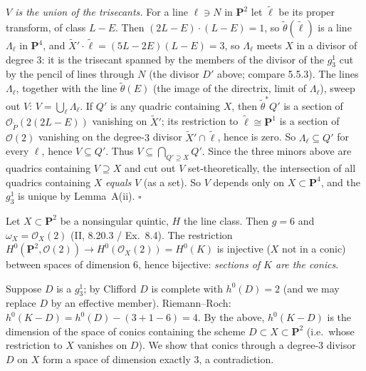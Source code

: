 \documentclass[11pt]{article}
\begin{document}
\emph{$V$ is the union of the trisecants.} For a line $\ell\ni N$ in $\mathbf P^2$ let $\tilde\ell$ be its proper transform, of class $L-E$. Then $(2L-E)\cdot(L-E)=1$, so $\tilde\theta(\tilde\ell)$ is a line $\Lambda_\ell$ in $\mathbf P^4$, and $\tilde X'\cdot\tilde\ell=(5L-2E)(L-E)=3$, so $\Lambda_\ell$ meets $X$ in a divisor of degree $3$: it is the trisecant spanned by the members of the divisor of the $g^1_3$ cut by the pencil of lines through $N$ (the divisor $D'$ above; compare 5.5.3). The lines $\Lambda_\ell$, together with the line $\tilde\theta(E)$ (the image of the directrix, limit of $\Lambda_\ell$), sweep out $V$: $V=\bigcup_\ell\Lambda_\ell$. If $Q'$ is any quadric containing $X$, then $\tilde\theta^*Q'$ is a section of $\mathcal O_{\tilde P}(2(2L-E))$ vanishing on $\tilde X'$; its restriction to $\tilde\ell\cong\mathbf P^1$ is a section of $\mathcal O(2)$ vanishing on the degree-$3$ divisor $\tilde X'\cap\tilde\ell$, hence is zero. So $\Lambda_\ell\subseteq Q'$ for every $\ell$, hence $V\subseteq Q'$. Thus $V\subseteq\bigcap_{Q'\supseteq X}Q'$. Since the three minors above are quadrics containing $V\supseteq X$ and cut out $V$ set-theoretically, the intersection of all quadrics containing $X$ \emph{equals} $V$ (as a set). So $V$ depends only on $X\subset\mathbf P^4$, and the $g^1_3$ is unique by Lemma~A(ii). \hfill$\square$

\pf
Let $X\subset\mathbf P^2$ be a nonsingular quintic, $H$ the line class. Then $g=6$ and $\omega_X=\mathcal O_X(2)$ (II, 8.20.3 / Ex.~8.4). The restriction $H^0(\mathbf P^2,\mathcal O(2))\to H^0(\mathcal O_X(2))=H^0(K)$ is injective ($X$ not in a conic) between spaces of dimension $6$, hence bijective: \emph{sections of $K$ are the conics}.

Suppose $D$ is a $g^1_3$; by Clifford $D$ is complete with $h^0(D)=2$ (and we may replace $D$ by an effective member). Riemann--Roch: $h^0(K-D)=h^0(D)-(3+1-6)=4$. By the above, $h^0(K-D)$ is the dimension of the space of conics containing the scheme $D\subset X\subset\mathbf P^2$ (i.e.\ whose restriction to $X$ vanishes on $D$). We show that conics through a degree-$3$ divisor $D$ on $X$ form a space of dimension exactly $3$, a contradiction.
\end{document}
